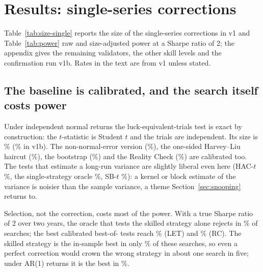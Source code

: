 \section{Results: single-series corrections}
\label{sec:results}



Table~\ref{tab:size-single} reports the size of the single-series corrections in v1 and Table~\ref{tab:power} raw and size-adjusted power at a Sharpe ratio of 2; the appendix gives the remaining validators, the other skill levels and the confirmation run v1b. Rates in the text are from v1 unless stated.

\subsection{The baseline is calibrated, and the search itself costs power}
Under independent normal returns the luck-equivalent-trials test is exact by construction: the $t$-statistic is Student $t$ and the trials are independent. Its size is \% (\% in v1b). The non-normal-error version (\%), the one-sided Harvey--Liu haircut (\%), the bootstrap (\%) and the Reality Check (\%) are calibrated too. The tests that estimate a long-run variance are slightly liberal even here (HAC-$t$ \%, the single-strategy oracle \%, SB-$t$ \%): a kernel or block estimate of the variance is noisier than the sample variance, a theme Section~\ref{sec:snooping} returns to.

Selection, not the correction, costs most of the power. With a true Sharpe ratio of 2 over two years, the oracle that tests the skilled strategy alone rejects in \% of searches; the best calibrated best-of- tests reach \% (LET) and \% (RC). The skilled strategy is the in-sample best in only \% of these searches, so even a perfect correction would crown the wrong strategy in about one search in five; under AR(1) returns it is the best in \%.

